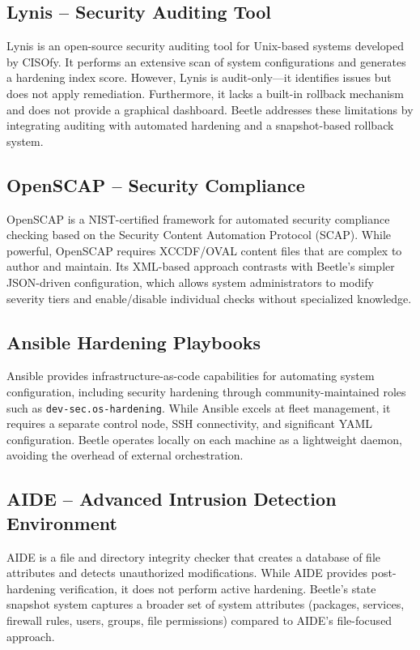 \subsection{Lynis -- Security Auditing Tool}
Lynis is an open-source security auditing tool for Unix-based systems developed by CISOfy. It performs an extensive scan of system configurations and generates a hardening index score. However, Lynis is audit-only---it identifies issues but does not apply remediation. Furthermore, it lacks a built-in rollback mechanism and does not provide a graphical dashboard. Beetle addresses these limitations by integrating auditing with automated hardening and a snapshot-based rollback system.

\subsection{OpenSCAP -- Security Compliance}
OpenSCAP is a NIST-certified framework for automated security compliance checking based on the Security Content Automation Protocol (SCAP). While powerful, OpenSCAP requires XCCDF/OVAL content files that are complex to author and maintain. Its XML-based approach contrasts with Beetle's simpler JSON-driven configuration, which allows system administrators to modify severity tiers and enable/disable individual checks without specialized knowledge.

\subsection{Ansible Hardening Playbooks}
Ansible provides infrastructure-as-code capabilities for automating system configuration, including security hardening through community-maintained roles such as \texttt{dev-sec.os-hardening}. While Ansible excels at fleet management, it requires a separate control node, SSH connectivity, and significant YAML configuration. Beetle operates locally on each machine as a lightweight daemon, avoiding the overhead of external orchestration.

\subsection{AIDE -- Advanced Intrusion Detection Environment}
AIDE is a file and directory integrity checker that creates a database of file attributes and detects unauthorized modifications. While AIDE provides post-hardening verification, it does not perform active hardening. Beetle's state snapshot system captures a broader set of system attributes (packages, services, firewall rules, users, groups, file permissions) compared to AIDE's file-focused approach.

